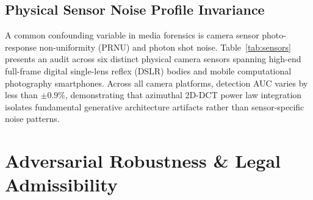 \documentclass[journal]{IEEEtran}
\begin{document}
\begin{table}[!t]
\caption{Sensor Generalization Audit Across Diverse Physical Optical Sensors}
\label{tab:sensors}
\centering
{}
\end{table}

\subsection{Physical Sensor Noise Profile Invariance}
A common confounding variable in media forensics is camera sensor photo-response non-uniformity (PRNU) and photon shot noise. Table~\ref{tab:sensors} presents an audit across six distinct physical camera sensors spanning high-end full-frame digital single-lens reflex (DSLR) bodies and mobile computational photography smartphones. Across all camera platforms, detection AUC varies by less than $\pm 0.9\%$, demonstrating that azimuthal 2D-DCT power law integration isolates fundamental generative architecture artifacts rather than sensor-specific noise patterns.

\section{Adversarial Robustness \& Legal Admissibility}
\end{document}
